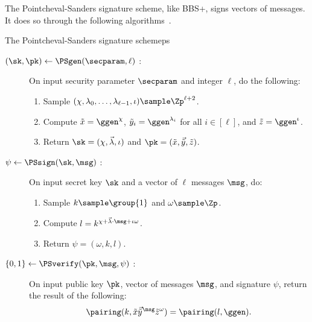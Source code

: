 The Pointcheval-Sanders signature scheme, like BBS+, signs vectors of messages.
It does so through the following algorithms~\cite{RSA:PoiSan16,RSA:PoiSan18}.

\begin{primitivebox}{The Pointcheval-Sanders signature scheme}{ps}

  \begin{description}

    \item[$(\sk, \pk) \leftarrow \PSgen(\secparam, \ell)$ :] On input security
      parameter $\secparam$ and integer $\ell$, do the following:

      \begin{enumerate}

        \item Sample $(\chi, \lambda_0, \ldots, \lambda_{\ell-1}, \iota)
          \sample \Zp^{\ell+2}$.

        \item Compute $\tilde{x} = \ggen^\chi$, $\tilde{y}_i =
          \ggen^{\lambda_i}$ for all $i \in [\ell]$, and $\tilde{z} =
          \ggen^\iota$.

        \item Return $\sk = (\chi, \vec{\lambda}, \iota)$ and $\pk =
          (\tilde{x}, \vec{\tilde{y}}, \tilde{z})$.

      \end{enumerate}

    \item[$\psi \leftarrow \PSsign(\sk, \msg)$ :] On input secret key $\sk$ and
      a vector of $\ell$ messages $\msg$, do:

      \begin{enumerate}

        \item Sample $k \sample \group{1}$ and $\omega \sample \Zp$.

        \item Compute $l = k^{\chi + \vec{\lambda} \cdot \msg + \iota\omega}$.

        \item Return $\psi = (\omega, k, l)$.

      \end{enumerate}

    \item[$\{0,1\} \leftarrow \PSverify(\pk, \msg, \psi)$ :] On input public
      key $\pk$, vector of messages $\msg$, and signature $\psi$, return the
      result of the following:
      \begin{equation*}
        \pairing(k, \tilde{x} \vec{\tilde{y}}^{\msg} \tilde{z}^\omega) =
        \pairing(l, \ggen).
      \end{equation*}

  \end{description}

\end{primitivebox}

